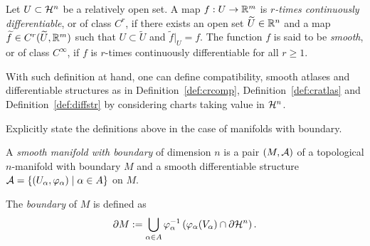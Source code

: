 \begin{definition}
  Let $U\subset\mathcal{H}^n$ be a relatively open set. A map $f: U\to\mathbb{R}^m$ is \emph{$r$-times continuously differentiable}, or of class $C^r$, if there exists an open set $\widetilde U\in\mathbb{R}^n$ and a map $\widetilde f\in C^r(\widetilde U, \mathbb{R}^m)$ such that $U\subset\widetilde U$ and $\widetilde f|_U = f$.
  The function $f$ is said to be \emph{smooth}, or of class $C^\infty$, if $f$ is $r$-times continuously differentiable for all $r\geq 1$.
\end{definition}

With such definition at hand, one can define compatibility, smooth atlases and differentiable structures as in Definition~\ref{def:crcomp}, Definition~\ref{def:cratlas} and Definition~\ref{def:diffstr} by considering charts taking value in $\mathcal{H}^n$.

\begin{exercise}
  Explicitly state the definitions above in the case of manifolds with boundary.
\end{exercise}

\begin{definition}\label{def:diffmanifoldwb}
  A \emph{smooth manifold with boundary} of dimension $n$ is a pair $(M, \mathcal{A})$ of a topological $n$-manifold with boundary $M$ and a smooth differentiable structure $\mathcal{A} = \{(U_\alpha, \varphi_\alpha) \mid \alpha\in A\}$ on $M$.
  
  The \emph{boundary} of $M$ is defined as
  \begin{equation}\label{def:bdry}
    \partial M := \bigcup_{\alpha\in A} \varphi_\alpha^{-1}\left(\varphi_\alpha(V_\alpha)\cap \partial\mathcal{H}^n\right).
  \end{equation}
\end{definition}

